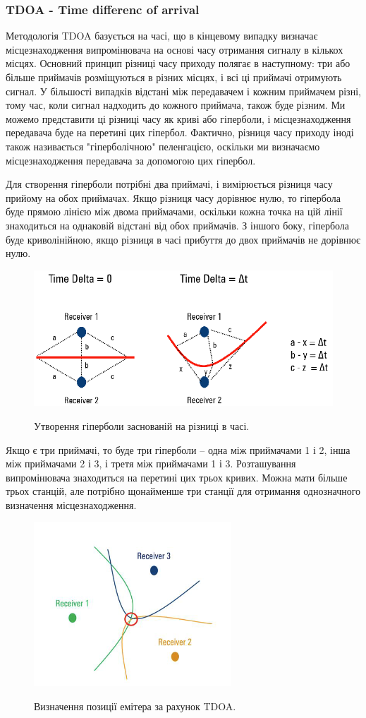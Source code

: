\documentclass{article}
\begin{document}
\subsubsection{TDOA - Time differenc of arrival}
Методологія TDOA базується на часі, що в кінцевому випадку визначає місцезнаходження випромінювача на основі часу отримання сигналу в кількох місцях. Основний принцип різниці часу приходу полягає в наступному: три або більше приймачів розміщуються в різних місцях, і всі ці приймачі отримують сигнал. У більшості випадків відстані між передавачем і кожним приймачем різні, тому час, коли сигнал надходить до кожного приймача, також буде різним. Ми можемо представити ці різниці часу як криві або гіперболи, і місцезнаходження передавача буде на перетині цих гіпербол. Фактично, різниця часу приходу іноді також називається "гіперболічною" пеленгацією, оскільки ми визначаємо місцезнаходження передавача за допомогою цих гіпербол.

Для створення гіперболи потрібні два приймачі, і вимірюється різниця часу прийому на обох приймачах. Якщо різниця часу дорівнює нулю, то гіпербола буде прямою лінією між двома приймачами, оскільки кожна точка на цій лінії знаходиться на однаковій відстані від обох приймачів. З іншого боку, гіпербола буде криволінійною, якщо різниця в часі прибуття до двох приймачів не дорівнює нулю.

\begin{figure}[H]
	\centering
	{\includegraphics[width=0.7\linewidth]{images/tdoa.png}}
	\caption{Утворення гіперболи заснованій на різниці в часі.}
\end{figure}

Якщо є три приймачі, то буде три гіперболи – одна між приймачами 1 і 2, інша між приймачами 2 і 3, і третя між приймачами 1 і 3. Розташування випромінювача знаходиться
на перетині цих трьох кривих. Можна мати більше трьох станцій, але
потрібно щонайменше три станції для отримання однозначного визначення місцезнаходження.


\begin{figure}[H]
	\centering
	{\includegraphics[width=0.4\linewidth]{images/tdoa-3p.png}}
	\caption{Визначення позиції емітера за рахунок TDOA.}
\end{figure}
\end{document}

